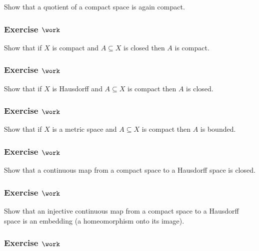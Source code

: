 Show that a quotient of a compact space is again compact.

\hypertarget{exercise-work-19}{%
\subsubsection{\texorpdfstring{Exercise
\(\work\)}{Exercise \textbackslash work}}\label{exercise-work-19}}

Show that if \(X\) is compact and \(A\subseteq X\) is closed then \(A\)
is compact.

\hypertarget{exercise-work-20}{%
\subsubsection{\texorpdfstring{Exercise
\(\work\)}{Exercise \textbackslash work}}\label{exercise-work-20}}

Show that if \(X\) is Hausdorff and \(A\subseteq X\) is compact then
\(A\) is closed.

\hypertarget{exercise-work-21}{%
\subsubsection{\texorpdfstring{Exercise
\(\work\)}{Exercise \textbackslash work}}\label{exercise-work-21}}

Show that if \(X\) is a metric space and \(A\subseteq X\) is compact
then \(A\) is bounded.

\hypertarget{exercise-work-22}{%
\subsubsection{\texorpdfstring{Exercise
\(\work\)}{Exercise \textbackslash work}}\label{exercise-work-22}}

Show that a continuous map from a compact space to a Hausdorff space is
closed.

\hypertarget{exercise-work-23}{%
\subsubsection{\texorpdfstring{Exercise
\(\work\)}{Exercise \textbackslash work}}\label{exercise-work-23}}

Show that an injective continuous map from a compact space to a
Hausdorff space is an embedding (a homeomorphism onto its image).

\hypertarget{exercise-work-24}{%
\subsubsection{\texorpdfstring{Exercise
\(\work\)}{Exercise \textbackslash work}}\label{exercise-work-24}}


